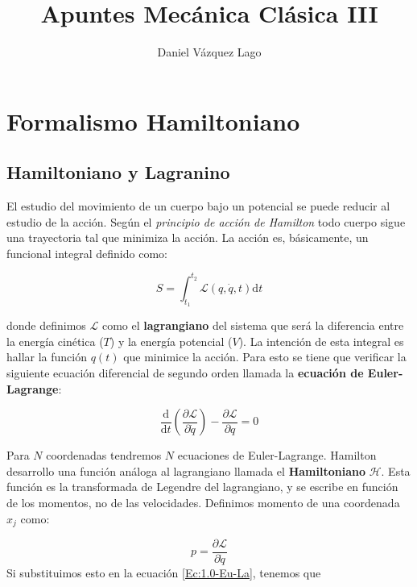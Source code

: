 \documentclass[12pt,a4paper]{article}
\title{Apuntes Mecánica Clásica III}
\author{Daniel Vázquez Lago}
\numberwithin{equation}{section}
\numberwithin{figure}{section}
\newcommand{\parentesis}[1]{\left( #1  \right)}
\newcommand{\parciales}[2]{\frac{\partial #1}{\partial #2}}
\newcommand{\D}{\mathrm{d}}
\newcommand{\derivadas}[2]{\frac{\D #1}{\D #2}}
\newcommand{\Lcal}{\mathcal{L}}
\newcommand{\Hcal}{\mathcal{H}}
\begin{document}
\maketitle

\newpage

\tableofcontents

\newpage

\section{Formalismo Hamiltoniano}

\subsection{Hamiltoniano y Lagranino}

El estudio del movimiento de un cuerpo bajo un potencial se puede reducir al estudio de la acción. Según el \textit{principio de acción de Hamilton} todo cuerpo sigue una trayectoria tal que minimiza la acción. La acción es, básicamente, un funcional integral definido como:

\begin{equation}
S = \int_{t_1}^{t_2} \mathcal{L} (q, \dot{q}, t) \D t
\end{equation}

donde definimos $\Lcal$ como el \textbf{lagrangiano} del sistema que será la diferencia entre la energía cinética ($T$) y la energía potencial ($V$). La intención de esta integral es hallar la función $q(t)$ que minimice la acción. Para esto se tiene que verificar la siguiente ecuación diferencial de segundo orden llamada la \textbf{ecuación de Euler-Lagrange}:

\begin{equation}
\derivadas{}{t} \parentesis{\parciales{\Lcal}{\dot{q}}} - \parciales{\Lcal}{q} = 0 \label{Ec:1.0-Eu-La}
\end{equation}

Para $N$ coordenadas tendremos $N$ ecuaciones de Euler-Lagrange. Hamilton desarrollo una función análoga al lagrangiano llamada el \textbf{Hamiltoniano} $\Hcal$. Esta función es la transformada de Legendre del lagrangiano, y se escribe en función de los momentos, no de las velocidades. Definimos momento de una coordenada $x_j$ como:

\begin{equation} 
p = \parciales{\Lcal}{\dot{q}} \label{Ec:1.0-p}
\end{equation}
Si substituimos esto en la ecuación \ref{Ec:1.0-Eu-La}, tenemos que
\end{document}
